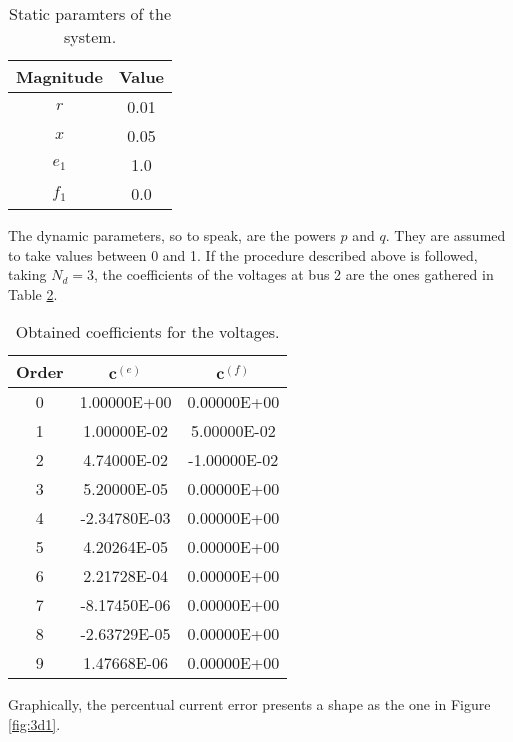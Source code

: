 \begin{table}[!htb]\centering
   \begin{tabular}{cc}
      \hline
      \textbf{Magnitude} & \textbf{Value} \\
      \hline
      \hline
      $r$ & 0.01 \\
      $x$ & 0.05 \\
      $e_1$ & 1.0 \\
      $f_1$ & 0.0 \\
      \hline
   \end{tabular}
   \caption{Static paramters of the system.}
   \label{tab:params}
\end{table}
The dynamic parameters, so to speak, are the powers $p$ and $q$. They are assumed to take values between 0 and 1. If the procedure described above is followed, taking $N_d=3$, the coefficients of the voltages at bus 2 are the ones gathered in Table \ref{tab:params}.

\begin{table}[!htb]\centering
   \begin{tabular}{ccc}
      \hline
      \textbf{Order} & $\bm{c}^{(e)}$ & $\bm{c}^{(f)}$ \\
      \hline
      \hline
      0 & 1.00000E+00 &	0.00000E+00 \\
      1 & 1.00000E-02 &	5.00000E-02 \\
      2 & 4.74000E-02 & -1.00000E-02 \\
      3 & 5.20000E-05 &	0.00000E+00 \\
      4 & -2.34780E-03 & 0.00000E+00 \\
      5 & 4.20264E-05 &	0.00000E+00 \\
      6 & 2.21728E-04 &	0.00000E+00 \\
      7 & -8.17450E-06 & 0.00000E+00 \\
      8 & -2.63729E-05 & 0.00000E+00 \\
      9 & 1.47668E-06 &	0.00000E+00 \\
      \hline
   \end{tabular}
   \caption{Obtained coefficients for the voltages.}
   \label{tab:params}
\end{table}
Graphically, the percentual current error presents a shape as the one in Figure \ref{fig:3d1}. 

